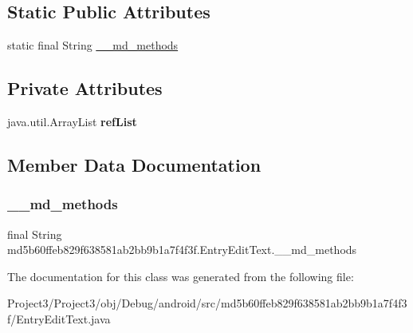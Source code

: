 \subsection*{Static Public Attributes}
\begin{DoxyCompactItemize}
\item 
static final String \hyperlink{classmd5b60ffeb829f638581ab2bb9b1a7f4f3f_1_1EntryEditText_a2ad10bc93868a1a331ee5c3f0f6447b6}{\+\_\+\+\_\+md\+\_\+methods}
\end{DoxyCompactItemize}
\subsection*{Private Attributes}
\begin{DoxyCompactItemize}
\item 
\mbox{\label{classmd5b60ffeb829f638581ab2bb9b1a7f4f3f_1_1EntryEditText_a3919b30a60433804ec3826c0a1cafe36}} 
java.\+util.\+Array\+List {\bfseries ref\+List}
\end{DoxyCompactItemize}


\subsection{Member Data Documentation}
\mbox{\label{classmd5b60ffeb829f638581ab2bb9b1a7f4f3f_1_1EntryEditText_a2ad10bc93868a1a331ee5c3f0f6447b6}} 
\subsubsection{\texorpdfstring{\+\_\+\+\_\+md\+\_\+methods}{\_\_md\_methods}}
{\footnotesize\ttfamily final String md5b60ffeb829f638581ab2bb9b1a7f4f3f.\+Entry\+Edit\+Text.\+\_\+\+\_\+md\+\_\+methods\hspace{0.3cm}{\ttfamily [static]}}



The documentation for this class was generated from the following file\+:\begin{DoxyCompactItemize}
\item 
Project3/\+Project3/obj/\+Debug/android/src/md5b60ffeb829f638581ab2bb9b1a7f4f3f/Entry\+Edit\+Text.\+java\end{DoxyCompactItemize}
